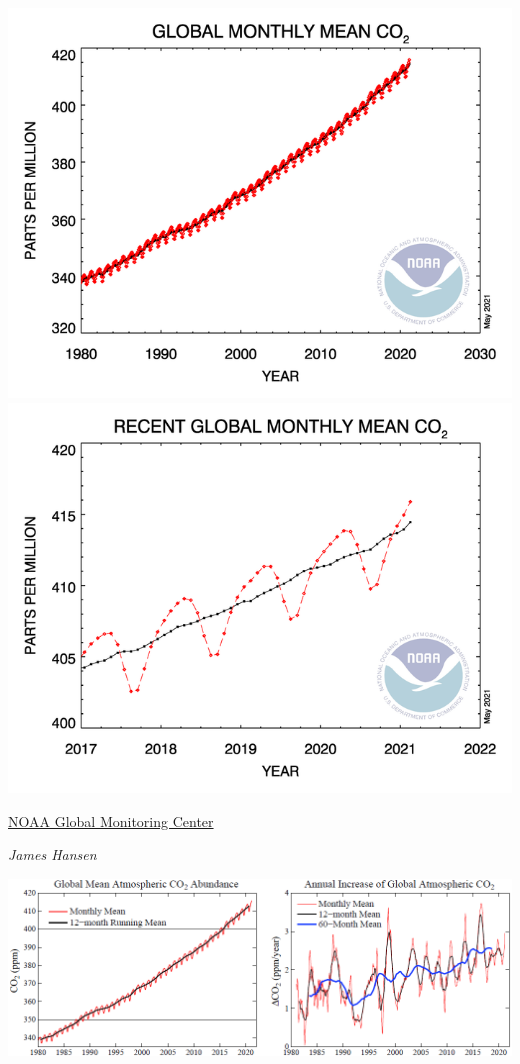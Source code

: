 \documentclass[
]{book}
\begin{document}
\includegraphics{fig/co2_trend_all_gl_may21.png}
\includegraphics{fig/co2_trend_gl_may21.png}

\href{https://gml.noaa.gov/ccgg/trends/global.html}{NOAA Global Monitoring Center}

\emph{James Hansen}

\includegraphics{fig/CO2_Annual_Increase.png}
\end{document}
